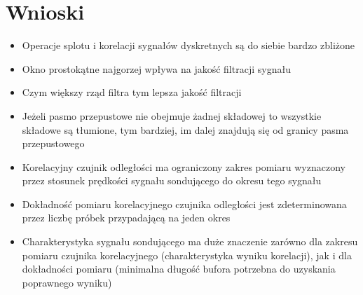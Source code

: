 \documentclass[12pt]{article}
\begin{document}
    \section{Wnioski} {
        \begin{itemize}
            \item Operacje splotu i korelacji sygnałów dyskretnych są do siebie bardzo
                zbliżone
            \item Okno prostokątne najgorzej wpływa na jakość filtracji sygnału
            \item Czym większy rząd filtra tym lepsza jakość filtracji
            \item Jeżeli pasmo przepustowe nie obejmuje żadnej składowej to wszystkie
                składowe są tłumione, tym bardziej, im dalej znajdują się od granicy pasma
                przepustowego
            \item Korelacyjny czujnik odległości ma ograniczony zakres pomiaru wyznaczony
                przez stosunek prędkości sygnału sondującego do okresu tego sygnału
            \item Dokładność pomiaru korelacyjnego czujnika odległości jest zdeterminowana
                przez liczbę próbek przypadającą na jeden okres
            \item Charakterystyka sygnału sondującego ma duże znaczenie zarówno dla
                zakresu pomiaru czujnika korelacyjnego (charakterystyka wyniku korelacji),
                jak i dla dokładności pomiaru (minimalna długość bufora potrzebna do
                uzyskania poprawnego wyniku)
        \end{itemize}
    }

\end{document}
